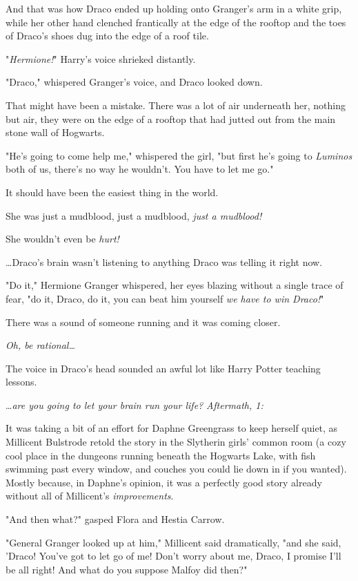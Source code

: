 And that was how Draco ended up holding onto Granger's arm in a white grip, 
while her other hand clenched frantically at the edge of the rooftop and the 
toes of Draco's shoes dug into the edge of a roof tile.

"\emph{Hermione!}" Harry's voice shrieked distantly.

"Draco," whispered Granger's voice, and Draco looked down.

That might have been a mistake. There was a lot of air underneath her, nothing 
but air, they were on the edge of a rooftop that had jutted out from the main 
stone wall of Hogwarts.

"He's going to come help me," whispered the girl, "but first he's going to 
\emph{Luminos} both of us, there's no way he wouldn't. You have to let me go."

It should have been the easiest thing in the world.

She was just a mudblood, just a mudblood, \emph{just a mudblood!}

She wouldn't even be \emph{hurt!}

{\ldots}Draco's brain wasn't listening to anything Draco was telling it right 
now.

"Do it," Hermione Granger whispered, her eyes blazing without a single trace of 
fear, "do it, Draco, do it, you can beat him yourself \emph{we have to win 
Draco!}"

There was a sound of someone running and it was coming closer.

\emph{Oh, be rational{\ldots}}

The voice in Draco's head sounded an awful lot like Harry Potter teaching 
lessons.

{\ldots}\emph{are you going to let your brain run your life?}
\sbreak
\emph{Aftermath, 1:}

It was taking a bit of an effort for Daphne Greengrass to keep herself quiet, 
as Millicent Bulstrode retold the story in the Slytherin girls' common room (a 
cozy cool place in the dungeons running beneath the Hogwarts Lake, with fish 
swimming past every window, and couches you could lie down in if you wanted). 
Mostly because, in Daphne's opinion, it was a perfectly good story already 
without all of Millicent's \emph{improvements}.

"And then what?" gasped Flora and Hestia Carrow.

"General Granger looked up at him," Millicent said dramatically, "and she said, 
'Draco! You've got to let go of me! Don't worry about me, Draco, I promise I'll 
be all right! And what do you suppose Malfoy did then?"


